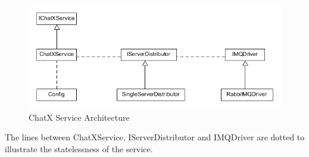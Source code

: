 \begin{figure}[h]
	\centering
	\includegraphics[width=0.7\linewidth]{img/ServiceArchitecture}
	\caption[Communication-diagram]{ChatX Service Architecture}
	\label{fig:ServiceArchitecture}
\end{figure}

The lines between ChatXService, IServerDistributor and IMQDriver are dotted to illustrate the statelessness of the service.

%